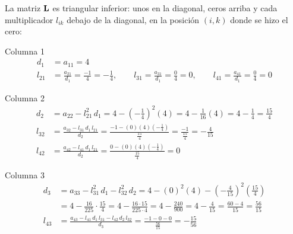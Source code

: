 La matriz $\mathbf{L}$ es triangular inferior: unos en la diagonal, ceros arriba y cada multiplicador $l_{ik}$ debajo de la diagonal, en la posición $(i,k)$ donde se hizo el cero:





Columna 1
\begin{align*}
	d_1 &= a_{11} = 4\\
	l_{21} &= \frac{a_{21}}{d_1} = \frac{-1}{4} = -\frac14, \qquad
	l_{31} = \frac{a_{31}}{d_1} = \frac{0}{4} = 0, \qquad
	l_{41} = \frac{a_{41}}{d_1} = \frac{0}{4} = 0
\end{align*}

Columna 2
\begin{align*}
	d_2 &= a_{22} - l_{21}^2\,d_1 = 4 - \left(-\tfrac14\right)^2(4) = 4 - \tfrac{1}{16}(4) = 4 - \tfrac14 = \tfrac{15}{4}\\
	l_{32} &= \frac{a_{32} - l_{31}\,d_1\,l_{21}}{d_2} = \frac{-1 - (0)(4)\left(-\frac14\right)}{\frac{15}{4}} = \frac{-1}{\frac{15}{4}} = -\frac{4}{15}\\
	l_{42} &= \frac{a_{42} - l_{41}\,d_1\,l_{21}}{d_2} = \frac{0 - (0)(4)\left(-\frac14\right)}{\frac{15}{4}} = 0
\end{align*}

Columna 3
\begin{align*}
	d_3 &= a_{33} - l_{31}^2\,d_1 - l_{32}^2\,d_2
	= 4 - (0)^2(4) - \left(-\tfrac{4}{15}\right)^2\left(\tfrac{15}{4}\right)\\
	&= 4 - \tfrac{16}{225}\cdot\tfrac{15}{4} = 4 - \tfrac{16\cdot 15}{225\cdot 4} = 4 - \tfrac{240}{900} = 4 - \tfrac{4}{15} = \tfrac{60 - 4}{15} = \tfrac{56}{15}\\
	l_{43} &= \frac{a_{43} - l_{41}\,d_1\,l_{31} - l_{42}\,d_2\,l_{32}}{d_3}
	= \frac{-1 - 0 - 0}{\frac{56}{15}} = -\frac{15}{56}
\end{align*}

